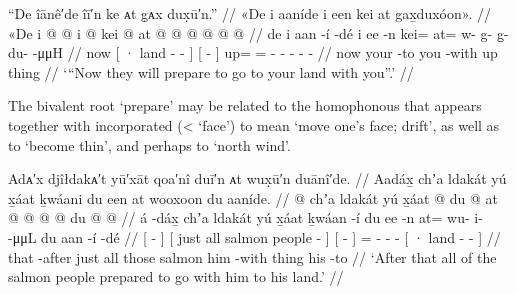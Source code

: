 \ex\label{ex:100-82-prepare-to-go}%
%
\begingl
	\glpreamble	“De îānê′de îī′n ke ᴀt g̣ᴀx dux̣ū′n.” //
	\glpreamble	«\!De i aaníde i een kei at gax̱duxóon\!». //
	\gla	«\!De 
		{} i  @ {} @ {} {} 
		{} i  @ {} {}
		kei @ at @  @ {} @ {} @ {} @ {} @ {} //
	\glb	\pqp{}de
		{} i aan -í -dé {}
		{} i ee -n {}
		kei= at= w- g- g̱- du-  -μμH //
	\glc	\pqp{}now
		{}[ · land - - {}]
		{}[   - {}]
		up= = - - - -  - //
	\gld	\pqp{}now
		{} your  {} -to {}
		{} you {} -with {}
		up thing  {} {} {} {} {} //
	\glft	‘“Now they will prepare to go to your land with you”.’
		//
\endgl
\xe

The bivalent root  ‘prepare’ may be related to the homophonous  that appears together with incorporated  (<  ‘face’) to mean ‘move one’s face; drift’, as well as to  ‘become thin’, and perhaps to  ‘north wind’.

\ex\label{ex:100-83-prepared-to-go}%
%
\begingl
	\glpreamble	Adᴀ′x djîłdakᴀ′t yū′xāt qoa′nî duī′n ᴀt wux̣ū′n duānî′de. //
	\glpreamble	Aadáx̱ chʼa ldakát yú x̱áat ḵwáani du een at wooxoon du aaníde. //
	\gla	{}  @ {} {} 
		{} chʼa ldakát yú x̱áat  @ {} {}
		{} du  @ {} {}
		at @  @ {} @ {} @ {}
		{} du  @ {} @ {} {} //
	\glb	{} á -dáx̱ {}
		{} chʼa ldakát yú x̱áat ḵwáan -í {}
		{} du ee -n {}
		at= wu- i-  -μμL
		{} du aan -í -dé {} //
	\glc	{}[  - {}]
		{}[ just all  salmon people - {}]
		{}[   - {}]
		= - -  -
		{}[ · land - - {}] //
	\gld	{} that -after {} 
		{} just all those salmon  {} {} 
		{} him {} -with {}
		thing  {} {} {}
		{} his  {} -to {} //
	\glft	‘After that all of the salmon people prepared to go with him to his land.’
		//
\endgl
\xe


